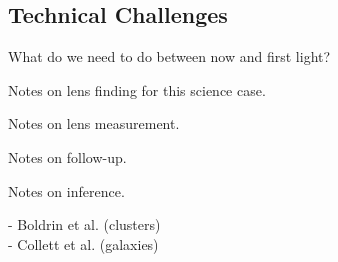 \documentclass{article}
\begin{document}
\subsection{Technical Challenges}

What do we need to do between now and first light?

Notes on lens finding for this science case.

Notes on lens measurement.

Notes on follow-up.

Notes on inference.






- Boldrin et al. (clusters)\\

- Collett et al. (galaxies)\\
\end{document}
